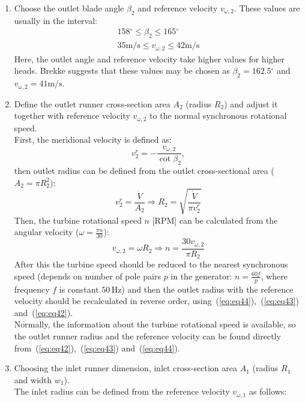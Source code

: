\documentclass[%
]{USN-PhD}
\begin{document}
\begin{enumerate}
  \item Choose the outlet blade angle $\beta_2$ and reference velocity $v_{\omega,2}$. These values are usually in the interval:
\begin{equation} \label{eq:eq41}
\begin{array}{ll}
158\mathrm{^\circ} \leq \beta_2 \leq 165\mathrm{^\circ} \\
35\mathrm{m/s} \leq v_{\omega,2} \leq 42\mathrm{m/s}
\end{array}
\end{equation}
  Here, the outlet angle and reference velocity take higher values for higher heads. Brekke suggests that these  values may be chosen as $\beta_2=162.5\mathrm{^\circ}$ and $v_{\omega,2}=41\mathrm{m/s}$.
  \item Define the outlet runner cross-section area $A_2$ (radius $R_2$) and adjust it together with reference velocity $v_{\omega,2}$ to the normal synchronous rotational speed.\\First, the meridional velocity is defined as:
\begin{equation} \label{eq:eq42}
{v_2^r} = -\frac{v_{\omega,2}}{\cot{\beta_2}},
\end{equation}
then outlet radius can be defined from the outlet cross-sectional area ($A_2=\pi R_2^2$):
\begin{equation} \label{eq:eq43}
{v_2^r} = \frac{\dot{V}}{A_2} \Rightarrow R_2=\sqrt{\frac{\dot{V}}{\pi v_2^r}}
\end{equation}
Then, the turbine rotational speed $n$ [$\mathrm{RPM}$] can be calculated from the angular velocity ($\omega=\frac{\pi n}{30}$):
\begin{equation} \label{eq:eq44}
{v_{\omega,2}}={\omega R_2} \Rightarrow n=\frac{30v_{\omega,2}}{\pi R_2}
\end{equation}
After this the turbine speed should be reduced to the nearest synchronous speed (depends on number of pole pairs $p$ in the generator: $n=\frac{60f}{p}$, where frequency $f$ is constant $50\,\mathrm{Hz}$) and then the outlet radius with the reference velocity should be recalculated in reverse order, using~(\ref{eq:eq44}),~(\ref{eq:eq43}) and~(\ref{eq:eq42}).\\ Normally, the information about the turbine rotational speed is available, so the outlet runner radius and the reference velocity can be found directly from~(\ref{eq:eq42}),~(\ref{eq:eq43}) and~(\ref{eq:eq44}).
  \item Choosing the inlet runner dimension, inlet cross-section area $A_1$ (radius $R_1$ and width $w_1$).\\ The inlet radius can be defined from the reference velocity $v_{\omega,1}$ as follows:

\end{enumerate}
\end{document}
